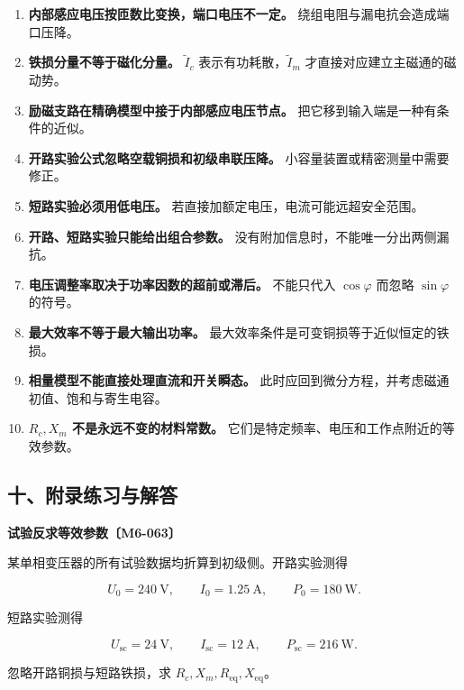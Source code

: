 \begin{enumerate}
\def\labelenumi{\arabic{enumi}.}
\tightlist
\item
  \textbf{内部感应电压按匝数比变换，端口电压不一定。}
  绕组电阻与漏电抗会造成端口压降。
\item
  \textbf{铁损分量不等于磁化分量。} \(\widetilde I_c\)
  表示有功耗散，\(\widetilde I_m\) 才直接对应建立主磁通的磁动势。
\item
  \textbf{励磁支路在精确模型中接于内部感应电压节点。}
  把它移到输入端是一种有条件的近似。
\item
  \textbf{开路实验公式忽略空载铜损和初级串联压降。}
  小容量装置或精密测量中需要修正。
\item
  \textbf{短路实验必须用低电压。}
  若直接加额定电压，电流可能远超安全范围。
\item
  \textbf{开路、短路实验只能给出组合参数。}
  没有附加信息时，不能唯一分出两侧漏抗。
\item
  \textbf{电压调整率取决于功率因数的超前或滞后。} 不能只代入
  \(\cos\varphi\) 而忽略 \(\sin\varphi\) 的符号。
\item
  \textbf{最大效率不等于最大输出功率。}
  最大效率条件是可变铜损等于近似恒定的铁损。
\item
  \textbf{相量模型不能直接处理直流和开关瞬态。}
  此时应回到微分方程，并考虑磁通初值、饱和与寄生电容。
\item
  \textbf{\(R_c,X_m\) 不是永远不变的材料常数。}
  它们是特定频率、电压和工作点附近的等效参数。
\end{enumerate}

\subsection{十、附录练习与解答}\label{m6:ux5341ux9644ux5f55ux7ec3ux4e60ux4e0eux89e3ux7b54}

\par{}
\noindent\begin{minipage}{\linewidth}

\textbf{试验反求等效参数〔M6-063〕}

某单相变压器的所有试验数据均折算到初级侧。开路实验测得

\[
U_0=240\ \mathrm V,
\qquad
I_0=1.25\ \mathrm A,
\qquad
P_0=180\ \mathrm W.
\]

短路实验测得

\[
U_{\mathrm{sc}}=24\ \mathrm V,
\qquad
I_{\mathrm{sc}}=12\ \mathrm A,
\qquad
P_{\mathrm{sc}}=216\ \mathrm W.
\]

忽略开路铜损与短路铁损，求 \(R_c,X_m,R_{\mathrm{eq}},X_{\mathrm{eq}}\)。

\end{minipage}\par

